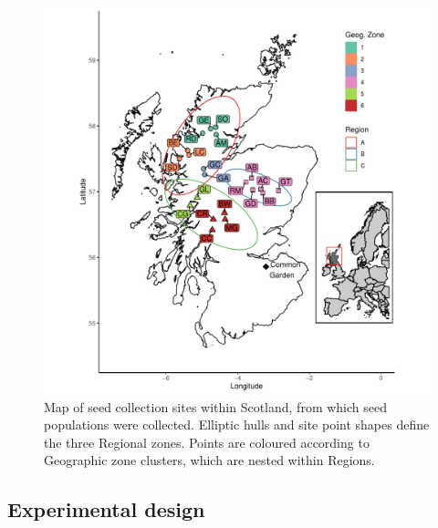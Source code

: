 \documentclass[a4paper, 11pt]{article}
\begin{document}
\begin{figure}
	\includegraphics[width=\textwidth]{site_map}
	\caption{Map of seed collection sites within Scotland, from which seed populations were collected. Elliptic hulls and site point shapes define the three Regional zones. Points are coloured according to Geographic zone clusters, which are nested within Regions.} 
	\label{site_map}
\end{figure}

\subsection*{Experimental design}
\end{document}
